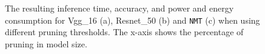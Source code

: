 \begin{figure}[!t]
\centering
{}
\hfill
{}
\hfill
{}
\hfill
\caption{The resulting inference time, accuracy, and power and energy consumption
for Vgg\_16 (a), Resnet\_50 (b) and \texttt{NMT} (c) when using different pruning thresholds.
The x-axis shows the percentage of pruning in model size. }
\label{fig:threshold}
\end{figure}

